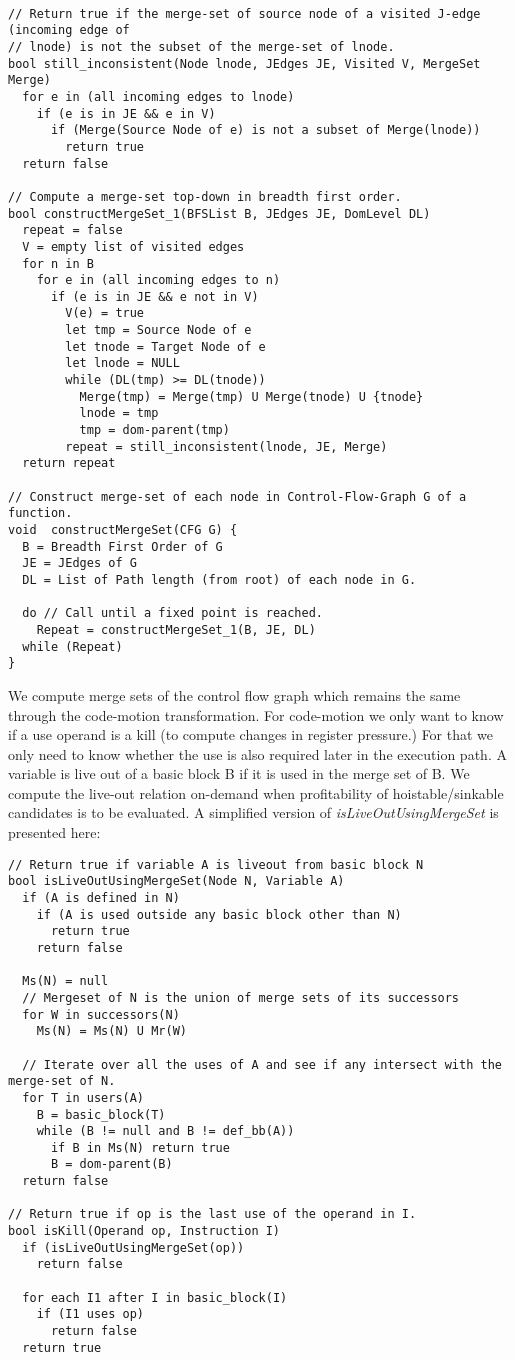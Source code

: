 \documentclass[acmlarge,review,anonymous]{acmart}\settopmatter{printfolios=true}
\begin{document}
\begin{verbatim}

// Return true if the merge-set of source node of a visited J-edge (incoming edge of
// lnode) is not the subset of the merge-set of lnode.
bool still_inconsistent(Node lnode, JEdges JE, Visited V, MergeSet Merge)
  for e in (all incoming edges to lnode)
    if (e is in JE && e in V)
      if (Merge(Source Node of e) is not a subset of Merge(lnode))
        return true
  return false

// Compute a merge-set top-down in breadth first order.
bool constructMergeSet_1(BFSList B, JEdges JE, DomLevel DL)
  repeat = false
  V = empty list of visited edges
  for n in B
    for e in (all incoming edges to n)
      if (e is in JE && e not in V)
        V(e) = true
        let tmp = Source Node of e
        let tnode = Target Node of e
        let lnode = NULL
        while (DL(tmp) >= DL(tnode))
          Merge(tmp) = Merge(tmp) U Merge(tnode) U {tnode}
          lnode = tmp
          tmp = dom-parent(tmp)
        repeat = still_inconsistent(lnode, JE, Merge)
  return repeat

// Construct merge-set of each node in Control-Flow-Graph G of a function.
void  constructMergeSet(CFG G) {
  B = Breadth First Order of G
  JE = JEdges of G
  DL = List of Path length (from root) of each node in G.

  do // Call until a fixed point is reached.
    Repeat = constructMergeSet_1(B, JE, DL)
  while (Repeat)
}
\end{verbatim}

We compute merge sets of the control flow graph which remains the same through
the code-motion transformation. For code-motion we only want to know if a use
operand is a kill (to compute changes in register pressure.) For that we only
need to know whether the use is also required later in the execution path. A
variable is live out of a basic block B if it is used in the merge set of B. We
compute the live-out relation on-demand when profitability of hoistable/sinkable
candidates is to be evaluated. A simplified version of
\emph{isLiveOutUsingMergeSet} is presented here:

\begin{verbatim}
// Return true if variable A is liveout from basic block N
bool isLiveOutUsingMergeSet(Node N, Variable A)
  if (A is defined in N)
    if (A is used outside any basic block other than N)
      return true
    return false

  Ms(N) = null
  // Mergeset of N is the union of merge sets of its successors
  for W in successors(N)
    Ms(N) = Ms(N) U Mr(W)

  // Iterate over all the uses of A and see if any intersect with the merge-set of N.
  for T in users(A)
    B = basic_block(T)
    while (B != null and B != def_bb(A))
      if B in Ms(N) return true
      B = dom-parent(B)
  return false

// Return true if op is the last use of the operand in I.
bool isKill(Operand op, Instruction I)
  if (isLiveOutUsingMergeSet(op))
    return false

  for each I1 after I in basic_block(I)
    if (I1 uses op)
      return false
  return true
\end{verbatim}
\end{document}
